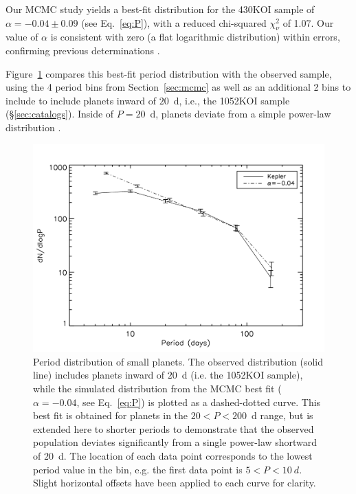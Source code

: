 Our MCMC study yields a best-fit distribution for the 430KOI sample of
$\alpha=-0.04 \pm 0.09$ (see Eq.~\ref{eq:P}), with a reduced 
chi-squared $\chi^2_{\nu}$ of
1.07. Our value of $\alpha$ is consistent with zero (a flat
logarithmic distribution) within errors, confirming previous
determinations \citep[e.g.,][]{Youdin,Howard2012,Petigura2013,Fressin2013}.

Figure~\ref{fig:period} compares this best-fit period distribution
with the observed sample, using the 4 period bins from Section~\ref{sec:mcmc}
as well as an additional 2 bins to include to include planets inward of
$20$~d, i.e., the 1052KOI sample (\S\ref{sec:catalogs}).
Inside of $P = 20$~d, \kep{}
planets deviate from a simple power-law distribution \citep[also
see][]{Youdin,Howard2012}.

\begin{figure}[h]
\centerline{\includegraphics[scale=0.55]{chap2/Silburt_period.pdf}}
\caption{Period distribution of \kep{} small planets. The observed
  distribution (solid line) includes planets inward of $20$~d (i.e. the
  1052KOI sample), while the simulated distribution from the MCMC best
  fit ($\alpha = -0.04$, see Eq.~\ref{eq:P}) is plotted as a
  dashed-dotted curve. This best fit is obtained for planets in the $20 <
  P < 200$~d range, but is extended here to shorter periods to
  demonstrate that the observed population deviates significantly from
  a single power-law shortward of $20$~d. The location of each data point
  corresponds to the lowest period value in the bin, e.g. the first data point is 
  $5<P<10~d$. Slight horizontal offsets have been applied to each curve for clarity.}
\label{fig:period}
\end{figure}


